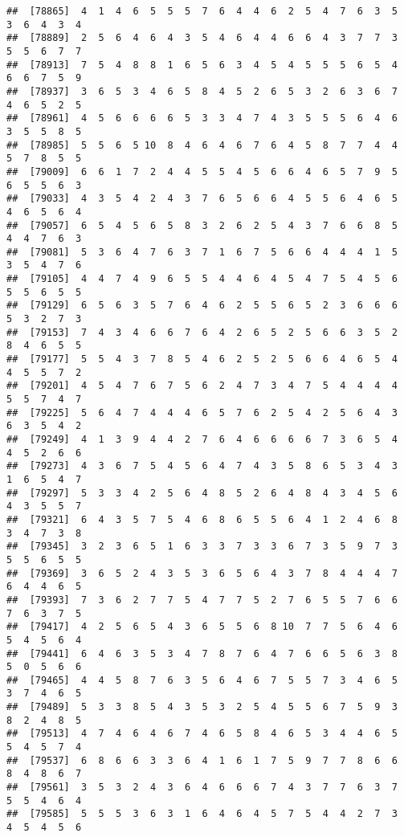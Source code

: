 \documentclass[
]{book}
\begin{document}
\begin{verbatim}
##  [78865]  4  1  4  6  5  5  5  7  6  4  4  6  2  5  4  7  6  3  5  3  6  4  3  4
##  [78889]  2  5  6  4  6  4  3  5  4  6  4  4  6  6  4  3  7  7  3  5  5  6  7  7
##  [78913]  7  5  4  8  8  1  6  5  6  3  4  5  4  5  5  5  6  5  4  6  6  7  5  9
##  [78937]  3  6  5  3  4  6  5  8  4  5  2  6  5  3  2  6  3  6  7  4  6  5  2  5
##  [78961]  4  5  6  6  6  6  5  3  3  4  7  4  3  5  5  5  6  4  6  3  5  5  8  5
##  [78985]  5  5  6  5 10  8  4  6  4  6  7  6  4  5  8  7  7  4  4  5  7  8  5  5
##  [79009]  6  6  1  7  2  4  4  5  5  4  5  6  6  4  6  5  7  9  5  6  5  5  6  3
##  [79033]  4  3  5  4  2  4  3  7  6  5  6  6  4  5  5  6  4  6  5  4  6  5  6  4
##  [79057]  6  5  4  5  6  5  8  3  2  6  2  5  4  3  7  6  6  8  5  4  4  7  6  3
##  [79081]  5  3  6  4  7  6  3  7  1  6  7  5  6  6  4  4  4  1  5  3  5  4  7  6
##  [79105]  4  4  7  4  9  6  5  5  4  4  6  4  5  4  7  5  4  5  6  5  5  6  5  5
##  [79129]  6  5  6  3  5  7  6  4  6  2  5  5  6  5  2  3  6  6  6  5  3  2  7  3
##  [79153]  7  4  3  4  6  6  7  6  4  2  6  5  2  5  6  6  3  5  2  8  4  6  5  5
##  [79177]  5  5  4  3  7  8  5  4  6  2  5  2  5  6  6  4  6  5  4  4  5  5  7  2
##  [79201]  4  5  4  7  6  7  5  6  2  4  7  3  4  7  5  4  4  4  4  5  5  7  4  7
##  [79225]  5  6  4  7  4  4  4  6  5  7  6  2  5  4  2  5  6  4  3  6  3  5  4  2
##  [79249]  4  1  3  9  4  4  2  7  6  4  6  6  6  6  7  3  6  5  4  4  5  2  6  6
##  [79273]  4  3  6  7  5  4  5  6  4  7  4  3  5  8  6  5  3  4  3  1  6  5  4  7
##  [79297]  5  3  3  4  2  5  6  4  8  5  2  6  4  8  4  3  4  5  6  4  3  5  5  7
##  [79321]  6  4  3  5  7  5  4  6  8  6  5  5  6  4  1  2  4  6  8  3  4  7  3  8
##  [79345]  3  2  3  6  5  1  6  3  3  7  3  3  6  7  3  5  9  7  3  5  5  6  5  5
##  [79369]  3  6  5  2  4  3  5  3  6  5  6  4  3  7  8  4  4  4  7  6  4  4  6  5
##  [79393]  7  3  6  2  7  7  5  4  7  7  5  2  7  6  5  5  7  6  6  7  6  3  7  5
##  [79417]  4  2  5  6  5  4  3  6  5  5  6  8 10  7  7  5  6  4  6  5  4  5  6  4
##  [79441]  6  4  6  3  5  3  4  7  8  7  6  4  7  6  6  5  6  3  8  5  0  5  6  6
##  [79465]  4  4  5  8  7  6  3  5  6  4  6  7  5  5  7  3  4  6  5  3  7  4  6  5
##  [79489]  5  3  3  8  5  4  3  5  3  2  5  4  5  5  6  7  5  9  3  8  2  4  8  5
##  [79513]  4  7  4  6  4  6  7  4  6  5  8  4  6  5  3  4  4  6  5  5  4  5  7  4
##  [79537]  6  8  6  6  3  3  6  4  1  6  1  7  5  9  7  7  8  6  6  8  4  8  6  7
##  [79561]  3  5  3  2  4  3  6  4  6  6  6  7  4  3  7  7  6  3  7  5  5  4  6  4
##  [79585]  5  5  5  3  6  3  1  6  4  6  4  5  7  5  4  4  2  7  3  4  5  4  5  6

\end{verbatim}
\end{document}
